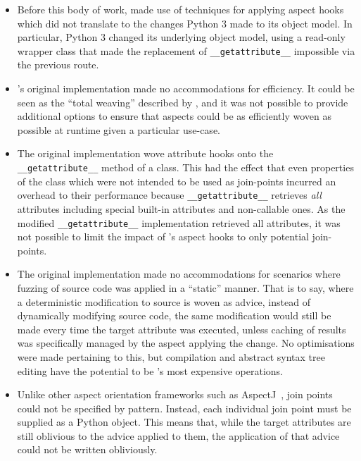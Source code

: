 \begin{itemize}
    \item Before this body of work, \pdsf made use of techniques for applying
      aspect hooks which did not translate to the changes Python 3 made to its
      object model. In particular, Python 3 changed its underlying object model,
      using a read-only wrapper class that made the replacement of
      \lstinline{__getattribute__} impossible via the previous route.
    \item \pdsf{}'s original implementation made no accommodations for
      efficiency. It could be seen as the ``total weaving'' described by
      \citet{dynamicAOchitchyan}, and it was not possible to provide additional
      options to ensure that aspects could be as efficiently woven as possible
      at runtime given a particular use-case.
    \item The original \pdsf implementation wove attribute hooks onto the
      \lstinline{__getattribute__} method of a class. This had the effect that
      even properties of the class which were not intended to be used as
      join-points incurred an overhead to their performance because
      \lstinline{__getattribute__} retrieves \emph{all} attributes including
      special built-in attributes and non-callable ones. As the modified
      \lstinline{__getattribute__} implementation retrieved all attributes, it
      was not possible to limit the impact of \pdsf{}'s aspect hooks to only
      potential join-points.
    \item The original \pdsf implementation made no accommodations for scenarios
      where fuzzing of source code was applied in a ``static'' manner. That is
      to say, where a deterministic modification to source is woven as advice,
      instead of dynamically modifying source code, the same modification would
      still be made every time the target attribute was executed, unless caching
      of results was specifically managed by the aspect applying the change. No
      optimisations were made pertaining to this, but compilation and abstract
      syntax tree editing have the potential to be \pdsf{}'s most expensive
      operations.
    \item Unlike other aspect orientation frameworks such as
      AspectJ~\cite{aspectj_intro}, join points could not be specified by
      pattern. Instead, each individual join point must be supplied as a Python
      object. This means that, while the target attributes are still oblivious
      to the advice applied to them, the application of that advice could not be
      written obliviously.
\end{itemize}

